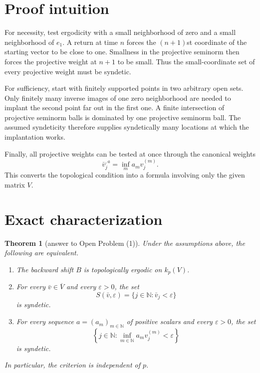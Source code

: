 \documentclass[11pt]{article}
\newtheorem{theorem}{Theorem}
\theoremstyle{remark}
\newcommand{\N}{\mathbb N}
\newcommand{\cV}{\overline V}
\newcommand{\kp}{k_p(V)}
\begin{document}
\section{Proof intuition}

For necessity, test ergodicity with a small neighborhood of zero and a
small neighborhood of $e_1$.  A return at time $n$ forces the $(n+1)$st
coordinate of the starting vector to be close to one.  Smallness in the
projective seminorm then forces the projective weight at $n+1$ to be small.
Thus the small-coordinate set of every projective weight must be syndetic.

For sufficiency, start with finitely supported points in two arbitrary open
sets.  Only finitely many inverse images of one zero neighborhood are
needed to implant the second point far out in the first one.  A finite
intersection of projective seminorm balls is dominated by one projective
seminorm ball.  The assumed syndeticity therefore supplies syndetically
many locations at which the implantation works.

Finally, all projective weights can be tested at once through the canonical
weights
\[
 \bar v^{,a}_j=\inf_m a_m v^{(m)}_j.
 \tag{3.1}
\]
This converts the topological condition into a formula involving only the
given matrix $V$.

\section{Exact characterization}

\begin{theorem}[answer to Open Problem (1)]\label{thm:main}
Under the assumptions above, the following are equivalent.
\begin{enumerate}
\item[(i)] The backward shift $B$ is topologically ergodic on $\kp$.
\item[(ii)] For every $\bar v\in\cV$ and every $\varepsilon>0$, the set
\[
 S(\bar v,\varepsilon)=\{j\in\N:\bar v_j<\varepsilon\}
 \tag{4.1}
\]
is syndetic.
\item[(iii)] For every sequence $a=(a_m)_{m\in\N}$ of positive scalars and
every $\varepsilon>0$, the set
\[
 \left\{j\in\N:\inf_{m\in\N}a_m v^{(m)}_j<\varepsilon\right\}
 \tag{4.2}
\]
is syndetic.
\end{enumerate}
In particular, the criterion is independent of $p$.
\end{theorem}
\end{document}
